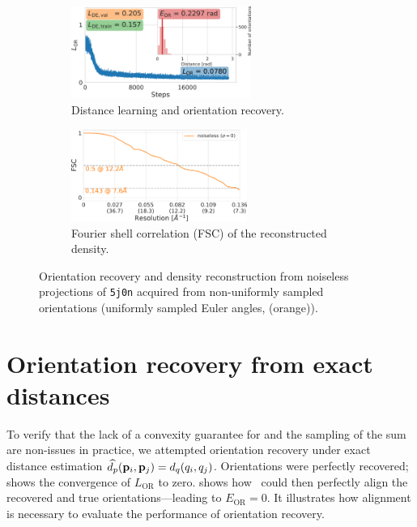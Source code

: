 \begin{figure}[ht!]
    \centering
    \begin{subfigure}[b]{0.48\linewidth}
        \centering
        \includegraphics[height=3cm]{figures/5j0n_ar_aa_fullcvg_smaller.pdf}
        \caption{Distance learning and orientation recovery.}%
        \label{fig:nonuniform:recovery}
    \end{subfigure}
    \hfill
    \begin{subfigure}[b]{0.48\linewidth}
        \centering
        \includegraphics[height=3cm]{figures/5j0n_fullcvg_noise0_FSC_apr_init_customFSC.pdf}
        \caption{Fourier shell correlation (FSC) of the reconstructed density.}%
        \label{fig:nonuniform:reconstruction}
    \end{subfigure}
    \caption{%
        Orientation recovery and density reconstruction from noiseless projections of \texttt{5j0n} acquired from non-uniformly sampled orientations (uniformly sampled Euler angles,  (orange)).
    }
\end{figure}

\section{Orientation recovery from exact distances}\label{apx:results:orientation-recovery:exact}


To verify that the lack of a convexity guarantee for  and the sampling of the sum are non-issues in practice, we attempted orientation recovery under exact distance estimation $\widehat{d_p}(\mathbf{p}_i, \mathbf{p}_j) = d_q(q_i, q_j)$.
Orientations were perfectly recovered;
 shows the convergence of $L_\text{OR}$ to zero.
 shows how~ could then perfectly align the recovered and true orientations---leading to $E_\text{OR} = 0$.
It illustrates how alignment is necessary to evaluate the performance of orientation recovery.

